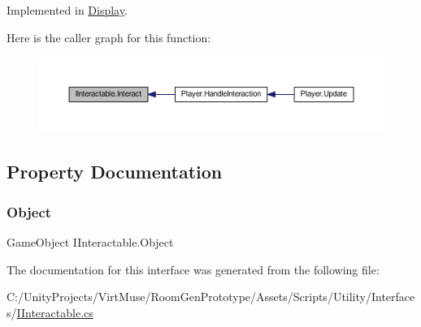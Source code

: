 Implemented in \mbox{\hyperlink{class_display_a43fc2a6f19bbf2f1bdb676392b37e921}{Display}}.

Here is the caller graph for this function\+:
\nopagebreak
\begin{figure}[H]
\begin{center}
\leavevmode
\includegraphics[width=350pt]{interface_i_interactable_a736e28381ac0e7ca60f5fae2feb95afe_icgraph}
\end{center}
\end{figure}


\subsection{Property Documentation}
\mbox{\label{interface_i_interactable_a1ea155218acad8d933577fa071de48af}} 
\subsubsection{\texorpdfstring{Object}{Object}}
{\footnotesize\ttfamily Game\+Object I\+Interactable.\+Object\hspace{0.3cm}{\ttfamily [get]}}



The documentation for this interface was generated from the following file\+:\begin{DoxyCompactItemize}
\item 
C\+:/\+Unity\+Projects/\+Virt\+Muse/\+Room\+Gen\+Prototype/\+Assets/\+Scripts/\+Utility/\+Interfaces/\mbox{\hyperlink{_i_interactable_8cs}{I\+Interactable.\+cs}}\end{DoxyCompactItemize}
